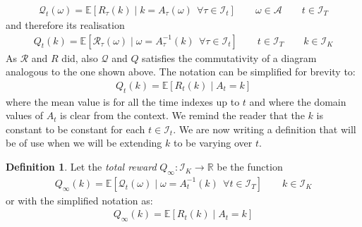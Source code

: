 \documentclass[]{scrartcl}
\theoremstyle{definition}
\newtheorem{definition}{Definition}[section]
\begin{document}
\begin{align}\label{def:mathcalQt}
\mathcal{Q}_t(\omega) = \mathbb{E} \left[ R_{\tau}(k)\mid k = A_{\tau}(\omega)~~ \forall \tau \in \mathcal{I}_t \right]
\qquad
\omega \in \mathcal{A}
\qquad
t \in \mathcal{I}_T
\end{align}
and therefore its realisation
\begin{align}\label{def:Qt}
Q_t(k) = \mathbb{E} \left[ \mathcal{R}_{\tau}(\omega)\mid \omega = A_{\tau}^{-1}(k)~~ \forall \tau \in \mathcal{I}_t \right]
\qquad
t \in \mathcal{I}_T
\qquad
k \in \mathcal{I}_K
\end{align}
As $\mathcal{R}$ and $R$ did, also $\mathcal{Q}$ and $Q$ satisfies the commutativity of a diagram analogous to the one shown above. The notation can be simplified for brevity to:
\begin{align}\label{def:mathcalQt_simple}
Q_t(k) = \mathbb{E} \left[ R_{t}(k) \mid A_{t} = k \right]
\end{align}
where the mean value is for all the time indexes up to $t$ and where the domain values of $A_t$ is clear from the context. We remind the reader that the $k$ is constant to be constant for each $t\in\mathcal{I}_t$. We are now writing a definition that will be of use when we will be extending $k$ to be varying over $t$.

\begin{definition}
    Let the \emph{total reward} $Q_{\infty}: \mathcal{I}_K \rightarrow \mathbb{R}$ be the function
    \begin{align}\label{def:mathcalQinf}
    Q_{\infty}(k) = \mathbb{E} \left[ \mathcal{Q}_{t}(\omega) \mid \omega = A^{-1}_{t}(k)~~ \forall t \in \mathcal{I}_T \right]
    \qquad
    k \in \mathcal{I}_K
    \end{align}
    or with the simplified notation as:
    \begin{align}\label{def:mathcalQinf_simple}
    Q_{\infty}(k) = \mathbb{E} \left[ R_{t}(k) \mid A_{t} = k \right]
    \end{align}
\end{definition}
\end{document}
